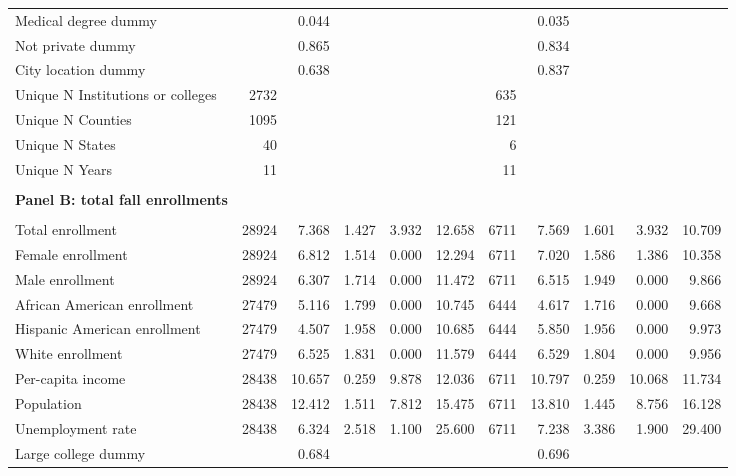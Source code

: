 \documentclass[12pt]{article}%
\begin{document}
\begin{table}
{\begin{tabular}[t]{lrrrrrrrrrr}
Medical degree dummy && \num{0.044} &&&&& \num{0.035}\\
Not private dummy && \num{0.865} &&&&& \num{0.834}\\
City location dummy && \num{0.638} &&&&& \num{0.837}\\
Unique N Institutions or colleges  & 2732 &&&&&  635\\
Unique N Counties & 1095 &&&&& 121\\
Unique N States & 40 &&&&& 6\\
Unique N Years & 11 &&&&& 11\\
\midrule \\[-1.8ex]
\textbf{Panel B: total fall enrollments}\\  \\[-1.8ex] 
Total enrollment & 28924 & \num{7.368} & \num{1.427} & \num{3.932} & \num{12.658} & 6711 & \num{7.569} & \num{1.601} & \num{3.932} & \num{10.709}\\
Female enrollment & 28924 & \num{6.812} & \num{1.514} & \num{0.000} & \num{12.294} & 6711 & \num{7.020} & \num{1.586} & \num{1.386} & \num{10.358}\\
Male enrollment & 28924 & \num{6.307} & \num{1.714} & \num{0.000} & \num{11.472} & 6711 & \num{6.515} & \num{1.949} & \num{0.000} & \num{9.866}\\
African American enrollment & 27479 & \num{5.116} & \num{1.799} & \num{0.000} & \num{10.745} & 6444 & \num{4.617} & \num{1.716} & \num{0.000} & \num{9.668}\\
Hispanic American enrollment & 27479 & \num{4.507} & \num{1.958} & \num{0.000} & \num{10.685} & 6444 & \num{5.850} & \num{1.956} & \num{0.000} & \num{9.973}\\
White enrollment & 27479 & \num{6.525} & \num{1.831} & \num{0.000} & \num{11.579} & 6444 & \num{6.529} & \num{1.804} & \num{0.000} & \num{9.956}\\
Per-capita income & 28438 & \num{10.657} & \num{0.259} & \num{9.878} & \num{12.036} & 6711 & \num{10.797} & \num{0.259} & \num{10.068} & \num{11.734}\\
Population & 28438 & \num{12.412} & \num{1.511} & \num{7.812} & \num{15.475} & 6711 & \num{13.810} & \num{1.445} & \num{8.756} & \num{16.128}\\
Unemployment rate & 28438 & \num{6.324} & \num{2.518} & \num{1.100} & \num{25.600} & 6711 & \num{7.238} & \num{3.386} & \num{1.900} & 
\num{29.400}\\
Large college dummy & & \num{0.684} &&&&& \num{0.696}\\

\end{tabular}}
\end{table}
\end{document}

